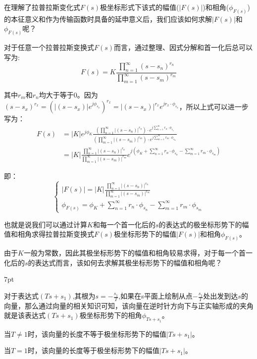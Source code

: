 \documentclass{article}
\numberwithin{equation}{section}
\numberwithin{figure}{section}
\newenvironment{formal}{%
\def\FrameCommand{%
\hspace{1pt}%
{\color{DarkBlue}\vrule width 2pt}%
{\color{formalshade}\vrule width 4pt}%
\colorbox{formalshade}%
}%
\MakeFramed{\advance\hsize-\width\FrameRestore}%
\noindent\hspace{-4.55pt}%
\begin{adjustwidth}{}{7pt}%
\vspace{2pt}\vspace{2pt}%
}
{%
\vspace{2pt}\end{adjustwidth}\endMakeFramed%
}
\begin{document}
在理解了拉普拉斯变化式$F(s)$极坐标形式下该式的幅值($|F(s)|$)和相角($\phi_{F(s)}$)的本征意义和作为传输函数时具备的延申意义后，我们应该如何求解$|F(s)|$和$\phi_{F(s)}$呢？

对于任意一个拉普拉斯变换式$F(s)$而言，通过整理、因式分解和首一化后总可以写为:
\begin{equation}
    F(s)=K\frac{\prod_{n=1}^{\infty}(s-s_n)^{r_n}}{\prod_{m=1}^{\infty}(s-s_m)^{r_m}}
\end{equation}

其中$r_m$和$r_n$均大于等于0。因为$(s-s_x)^{r_x}=(|(s-s_x)|e^{j\phi_{s_x}})^{r_x}=|(s-s_x)|^{r_x}e^{jr_x·\phi_{s_x}}$，所以上式可以进一步写为：
\begin{equation}
    \begin{split}
        F(s)&=|K|e^{j\phi_K}\frac{(\prod_{n=1}^{\infty}|(s-s_n)|^{r_n})·e^{j\sum_{n=1}^{\infty}r_n·\phi_{s_n}}}{(\prod_{m=1}^{\infty}|(s-s_m)|^{r_m})·e^{j\sum_{m=1}^{\infty}r_m·\phi_{s_m}}}\\
        &=|K|\frac{\prod_{n=1}^{\infty}|(s-s_n)|^{r_n}}{\prod_{m=1}^{\infty}|(s-s_m)|^{r_m}}e^{j(\phi_K+\sum_{n=1}^{\infty}r_n·\phi_{s_n}-\sum_{m=1}^{\infty}r_m·\phi_{s_m})}
    \end{split}
\end{equation}

即：
\begin{equation}
    \begin{cases}
        |F(s)|=|K|\frac{\prod_{n=1}^{\infty}|(s-s_n)|^{r_n}}{\prod_{m=1}^{\infty}|(s-s_m)|^{r_m}}\\
        \phi_{F(s)}=\phi_K+\sum_{n=1}^{\infty}r_n·\phi_{s_n}-\sum_{m=1}^{\infty}r_m·\phi_{s_m}
    \end{cases}\label{laplacepolarcoordinate}
\end{equation}

也就是说我们可以通过计算$K$和每一个首一化后的$s$的表达式的极坐标形势下的幅值和相角求得拉普拉斯变换式$F(s)$极坐标形势下的幅值$|F(s)|$和相角$\phi_{F(s)}$。

由于$K$一般为常数，因此其极坐标形势下的幅值和相角较易求得，对于每一个首一化后的$s$的表达式而言，该如何去求解其极坐标形势下的幅值和相角呢？
\begin{formal}
    对于表达式$(Ts+s_1)$,其根为$s=-\frac{s_1}{T}$,如果在s平面上绘制从点$-\frac{s_1}{T}$处出发到达$s$的向量，那么通过向量的相关知识可知，该向量在逆时针方向下与正实轴形成的夹角就是该表达式$(Ts+s_1)$极坐标形势下的相角$\phi_{Ts+s_1}$。

    当$T\neq 1$时，该向量的长度不等于极坐标形势下的幅值$|Ts+s_1|$。

    当$T=1$时，该向量的长度等于极坐标形势下的幅值$|Ts+s_1|$。
\end{formal}
\end{document}
